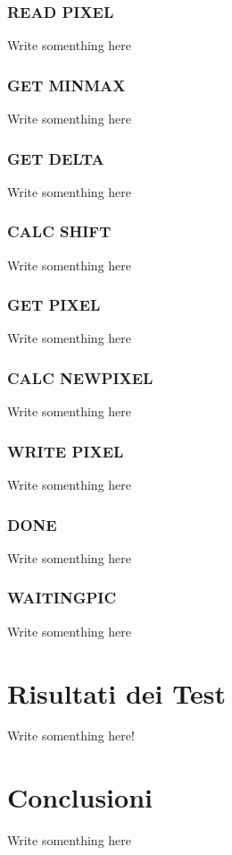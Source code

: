 \documentclass{article}
\begin{document}
\subsubsection{READ PIXEL}
Write somenthing here

\subsubsection{GET MINMAX}
Write somenthing here

\subsubsection{GET DELTA}
Write somenthing here

\subsubsection{CALC SHIFT}
Write somenthing here

\subsubsection{GET PIXEL}
Write somenthing here

\subsubsection{CALC NEWPIXEL}
Write somenthing here

\subsubsection{WRITE PIXEL}
Write somenthing here

\subsubsection{DONE}
Write somenthing here

\subsubsection{WAITINGPIC}
Write somenthing here

\section{Risultati dei Test}
Write somenthing here!

\section{Conclusioni}
Write somenthing here
\end{document}
